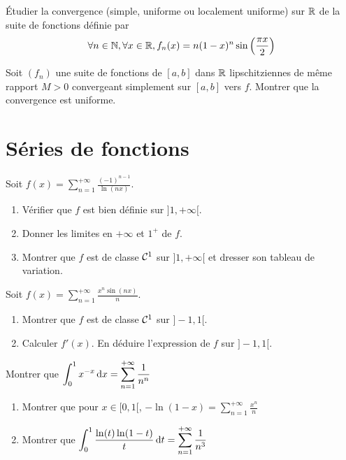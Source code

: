 \documentclass[12pt,a4paper]{exo_book}
\begin{document}
\begin{exo}
    Étudier la convergence (simple, uniforme ou localement uniforme) sur $\mathbb{R}$ de la suite de fonctions définie par
    \[\forall n \in \mathbb{N}, \forall x \in \mathbb{R}, f_n (x) = n (1-x)^n \sin \left(\frac{\pi x}{2}\right)\]
\end{exo}

\begin{exo}
    Soit $(f_n)$ une suite de fonctions de $[a,b]$ dans $\mathbb{R}$ lipschitziennes de même rapport $M > 0$ convergeant simplement sur $[a,b]$ vers $f$. Montrer que la convergence est uniforme.
\end{exo}

\section{Séries de fonctions}

\begin{exo}
    Soit $\displaystyle f(x) = \sum_{n=1}^{+\infty} \frac{(-1)^{n-1}}{\ln(nx)}$.

    \begin{enumerate}
        \item Vérifier que $f$ est bien définie sur $]1, +\infty[$.
        \item Donner les limites en $+\infty$ et $1^+$ de $f$.
        \item Montrer que $f$ est de classe $\mathcal{C}^1$ sur $]1, +\infty[$ et dresser son tableau de variation.
    \end{enumerate}
\end{exo}

\begin{exo}
    Soit $\displaystyle f(x) = \sum_{n=1}^{+\infty} \frac{x^n \sin (nx)}{n}$.

    \begin{enumerate}
        \item Montrer que $f$ est de classe $\mathcal{C}^1$ sur $]-1,1[$.
        \item Calculer $f'(x)$. En déduire l'expression de $f$ sur $]-1,1[$.
    \end{enumerate}
\end{exo}

\begin{exo}
    Montrer que $\displaystyle \int_0^1 x^{-x} {\rm \, d} x = \sum_{n=1}^{+\infty} \frac{1}{n^n}$
\end{exo}

\begin{exo}
    \begin{enumerate}
        \item Montrer que pour $x \in [0,1[$, $\displaystyle - \ln (1-x) = \sum_{n=1}^{+\infty} \frac{x^n}{n}$
        \item Montrer que $\displaystyle \int_0^1 \frac{\ln(t)\ln(1-t)}{t} {\rm \, d} t = \sum_{n=1}^{+\infty} \frac{1}{n^3}$
    \end{enumerate}
\end{exo}
\end{document}
